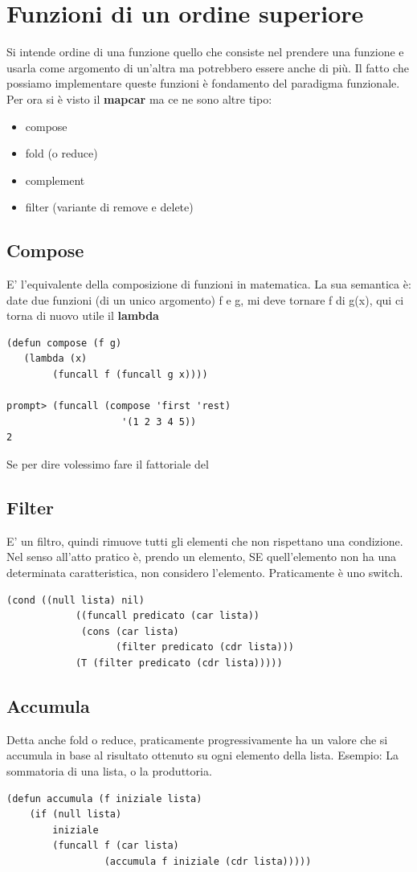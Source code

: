 \documentclass[12pt, a4paper, openany, oneside]{book}
\begin{document}
\section{Funzioni di un ordine superiore}
Si intende ordine di una funzione quello che consiste nel prendere una funzione
e usarla come argomento di un'altra ma potrebbero essere anche di più. Il fatto che possiamo
implementare queste funzioni è fondamento del paradigma funzionale. Per ora
si è visto il \textbf{mapcar} ma ce ne sono altre tipo:
\begin{itemize}
	\item compose
	\item fold (o reduce)
	\item complement
	\item filter (variante di remove e delete)
\end{itemize}
\subsection{Compose}
E' l'equivalente della composizione di funzioni in matematica. La sua semantica è:
date due funzioni (di un unico argomento) f e g, mi deve tornare f di g(x), qui
ci torna di nuovo utile il \textbf{lambda}
\begin{lstlisting}[language=LISP]
(defun compose (f g)
   (lambda (x)
		(funcall f (funcall g x)))) 

prompt>	(funcall (compose 'first 'rest)
					'(1 2 3 4 5))
2
\end{lstlisting} 
Se per dire volessimo fare il fattoriale del 
\subsection{Filter}
E' un filtro, quindi rimuove tutti gli elementi che non rispettano una condizione.
Nel senso all'atto pratico è, prendo un elemento, SE quell'elemento non ha una
determinata caratteristica, non considero l'elemento. Praticamente è uno switch.
\begin{lstlisting}[language=LISP]
      (cond ((null lista) nil)
            ((funcall predicato (car lista))
             (cons (car lista)
                   (filter predicato (cdr lista)))
            (T (filter predicato (cdr lista)))))	
\end{lstlisting}
\subsection{Accumula}
Detta anche fold o reduce, praticamente progressivamente ha un valore che si
accumula in base al risultato ottenuto su ogni elemento della lista. Esempio:
La sommatoria di una lista, o la produttoria.
\begin{lstlisting}[language=LISP]
(defun accumula (f iniziale lista)
   	(if (null lista)
		iniziale
		(funcall f (car lista)
        		 (accumula f iniziale (cdr lista)))))
\end{lstlisting}
\end{document}
